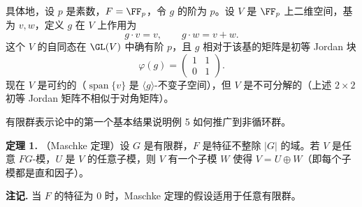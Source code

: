 \begin{enumerate}[label=(\arabic*)]
  具体地，设 $p$ 是素数，$F=\FF_p$，令 $g$ 的阶为 $p$。设 $V$ 是 $\FF_p$ 上二维空间，基为 $v,w$，定义 $g$ 在 $V$ 上作用为
  \[
    g\cdot v=v,
    \qquad g\cdot w=v+w.
  \]
  这个 $V$ 的自同态在 $\GL(V)$ 中确有阶 $p$，且 $g$ 相对于该基的矩阵是初等 Jordan 块
  \[
    \varphi(g)=\begin{pmatrix}1&1\\0&1\end{pmatrix}.
  \]
  现在 $V$ 是可约的（$\operatorname{span}\{v\}$ 是 $\langle g\rangle$-不变子空间），但 $V$ 是不可分解的（上述 $2\times2$ 初等 Jordan 矩阵不相似于对角矩阵）。
\end{enumerate}

有限群表示论中的第一个基本结果说明例 5 如何推广到非循环群。

\medskip
\noindent\textbf{定理 1.} （Maschke 定理）设 $G$ 是有限群，$F$ 是特征不整除 $|G|$ 的域。若 $V$ 是任意 $FG$-模，$U$ 是 $V$ 的任意子模，则 $V$ 有一个子模 $W$ 使得 $V=U\oplus W$（即每个子模都是直和因子）。

\noindent\textbf{注记.} 当 $F$ 的特征为 $0$ 时，Maschke 定理的假设适用于任意有限群。

